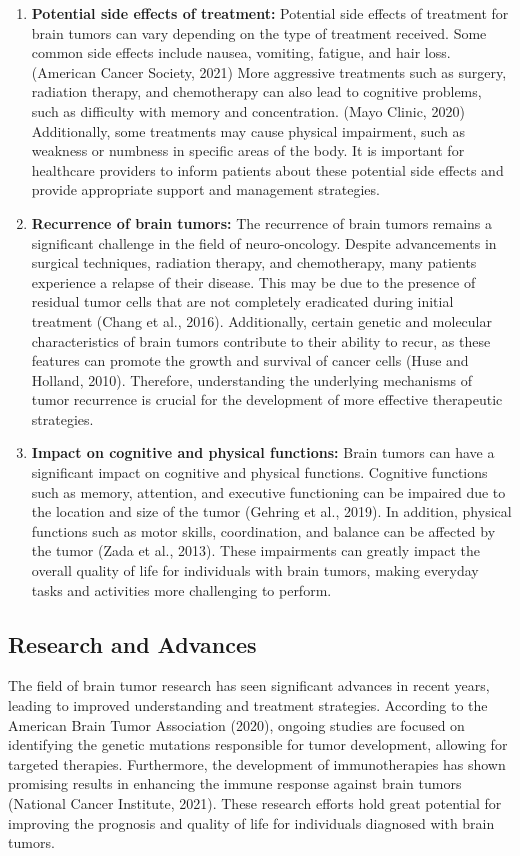 \documentclass[12pt,oneside]{report}
\begin{document}
\begin{enumerate}
\item \textbf{Potential side effects of treatment:}
Potential side effects of treatment for brain tumors can vary depending on the type of treatment received. 
Some common side effects include nausea, vomiting, fatigue, and hair loss. (American Cancer Society, 
2021) More aggressive treatments such as surgery, radiation therapy, and chemotherapy can also lead to 
cognitive problems, such as difficulty with memory and concentration. (Mayo Clinic, 2020) Additionally, 
some treatments may cause physical impairment, such as weakness or numbness in specific areas of the 
body. It is important for healthcare providers to inform patients about these potential side effects and 
provide appropriate support and management strategies.

\item \textbf{Recurrence of brain tumors:}
The recurrence of brain tumors remains a significant challenge in the field of neuro-oncology. Despite 
advancements in surgical techniques, radiation therapy, and chemotherapy, many patients experience a 
relapse of their disease. This may be due to the presence of residual tumor cells that are not completely 
eradicated during initial treatment (Chang et al., 2016). Additionally, certain genetic and molecular 
characteristics of brain tumors contribute to their ability to recur, as these features can promote the 
growth and survival of cancer cells (Huse and Holland, 2010). Therefore, understanding the underlying 
mechanisms of tumor recurrence is crucial for the development of more effective therapeutic strategies.

\item \textbf{Impact on cognitive and physical functions:}
Brain tumors can have a significant impact on cognitive and physical functions. Cognitive functions such 
as memory, attention, and executive functioning can be impaired due to the location and size of the tumor 
(Gehring et al., 2019). In addition, physical functions such as motor skills, coordination, and balance can 
be affected by the tumor (Zada et al., 2013). These impairments can greatly impact the overall quality of 
life for individuals with brain tumors, making everyday tasks and activities more challenging to perform.

\end{enumerate}

\subsection{ Research and Advances}
The field of brain tumor research has seen significant advances in recent years, leading to improved 
understanding and treatment strategies. According to the American Brain Tumor Association (2020), 
ongoing studies are focused on identifying the genetic mutations responsible for tumor development, 
allowing for targeted therapies. Furthermore, the development of immunotherapies has shown promising 
results in enhancing the immune response against brain tumors (National Cancer Institute, 2021). These 
research efforts hold great potential for improving the prognosis and quality of life for individuals 
diagnosed with brain tumors.
\end{document}
